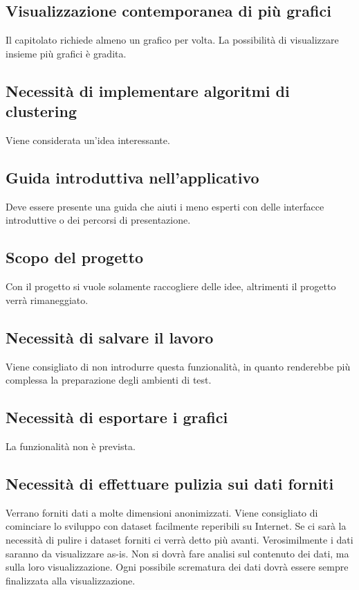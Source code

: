 \documentclass{article}
\begin{document}
    \subsection{Visualizzazione contemporanea di più grafici}
    \label{sub:domanda_04}
    Il capitolato richiede almeno un grafico per volta. La possibilità di visualizzare insieme più grafici è gradita.

    \subsection{Necessità di implementare algoritmi di clustering}
    \label{sub:domanda_05}
    Viene considerata un'idea interessante.

    \subsection{Guida introduttiva nell'applicativo}
    \label{sub:domanda_06}
    Deve essere presente una guida che aiuti i meno esperti con delle interfacce introduttive o dei percorsi di presentazione.

    \subsection{Scopo del progetto}
    \label{sub:domanda_07}
    Con il progetto si vuole solamente raccogliere delle idee, altrimenti il progetto verrà rimaneggiato.

    \subsection{Necessità di salvare il lavoro}
    \label{sub:domanda_08}
    Viene consigliato di non introdurre questa funzionalità, in quanto renderebbe più complessa la preparazione degli ambienti di test.
    
    \subsection{Necessità di esportare i grafici}
    \label{sub:domanda_09}
    La funzionalità non è prevista.
    
    \subsection{Necessità di effettuare pulizia sui dati forniti}
    \label{sub:domanda_10}
    Verrano forniti dati a molte dimensioni anonimizzati. Viene consigliato di cominciare lo sviluppo con dataset facilmente reperibili su Internet. Se ci sarà la necessità di pulire i dataset forniti ci verrà detto più avanti. Verosimilmente i dati saranno da visualizzare as-is. Non si dovrà fare analisi sul contenuto dei dati, ma sulla loro visualizzazione. Ogni possibile scrematura dei dati dovrà essere sempre finalizzata alla visualizzazione.
\end{document}
